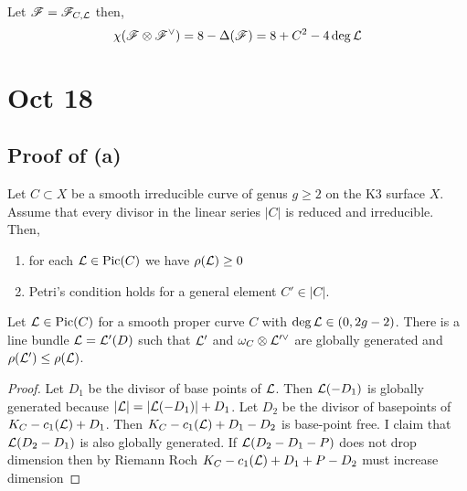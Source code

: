 \documentclass[12pt]{article}
\begin{document}
\begin{lemma}
Let $\mathscr{F} = \mathscr{F}_{C, \mathcal{L}}$ then,
\[ \chi(\mathscr{F} \otimes \mathscr{F}^\vee) = 8 - \Delta(\mathscr{F}) = 8 + C^2 - 4 \deg{\mathcal{L}} \]
\end{lemma}

\section{Oct 18}

\subsection{Proof of (a)}

\begin{theorem}[Main]
Let $C \subset X$ be a smooth irreducible curve of genus $g \ge 2$ on the K3 surface $X$. Assume that every divisor in the linear series $|C|$ is reduced and irreducible. Then,
\begin{enumerate}
\item for each $\mathcal{L} \in \mathrm{Pic}{(C)}$ we have $\rho(\mathcal{L}) \ge 0$
\item Petri's condition holds for a general element $C' \in |C|$.
\end{enumerate}
\end{theorem}

\begin{lemma}
Let $\mathcal{L} \in \mathrm{Pic}{(C)}$ for a smooth proper curve $C$ with $\deg{\mathcal{L}} \in (0, 2g - 2)$. There is a line bundle $\mathcal{L} = \mathcal{L}'(D)$ such that $\mathcal{L}'$ and $\omega_C \otimes \mathcal{L}'^\vee$ are globally generated and $\rho(\mathcal{L}') \le \rho(\mathcal{L})$.
\end{lemma}

\begin{proof}
Let $D_1$ be the divisor of base points of $\mathcal{L}$. Then $\mathcal{L}(-D_1)$ is globally generated because $|\mathcal{L}| = |\mathcal{L}(-D_1)| + D_1$. Let $D_2$ be the divisor of basepoints of $K_C - c_1(\mathcal{L}) + D_1$. Then $K_C - c_1(\mathcal{L}) + D_1 - D_2$ is base-point free. I claim that $\mathcal{L}(D_2 - D_1)$ is also globally generated. If $\mathcal{L}(D_2 - D_1 - P)$ does not drop dimension then by Riemann Roch $K_C - c_1(\mathcal{L}) + D_1 + P - D_2$ must increase dimension 
\end{proof}
\end{document}
